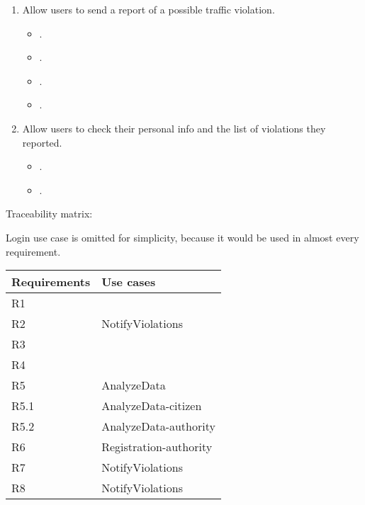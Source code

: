 \begin{enumerate}[label={G\arabic*.}]
\begin{enumerate}[label={G\arabic{enumi}.\arabic*.}]
\begin{itemize}[label={}]
		\end{itemize}
	\end{enumerate}
	\item Allow users to send a report of a possible traffic violation.
	\begin{itemize}[label={}]
		\item {}.
		\item {}.
		\item {}.
		\item {}. 
	\end{itemize}
	\item Allow users to check their personal info and the list of violations they reported.
	\begin{itemize}[label={}]
		\item {}.
		\item {}.
	\end{itemize} 
\end{enumerate}

\bigskip
Traceability matrix:


Login use case is omitted for simplicity, because it would be used in almost every requirement.


\begin{tabular}{|l|>{\raggedright\arraybackslash}p{8cm}|}
	\hline 
	Requirements & Use cases \\ 
	\hline 
	R1 &  \\ 
	\hline 
	R2 &  NotifyViolations\\ 
	\hline 
	R3 &  \\ 
	\hline 
	R4 &  \\ 
	\hline 
	R5 & AnalyzeData \\ 
	\hline 
	R5.1& AnalyzeData-citizen \\ 
	\hline 
	R5.2& AnalyzeData-authority \\ 
	\hline 
	R6 & Registration-authority \\ 
	\hline 
	R7 & NotifyViolations \\ 
	\hline 
	R8 & NotifyViolations \\ 
	\hline 
\end{tabular} 
